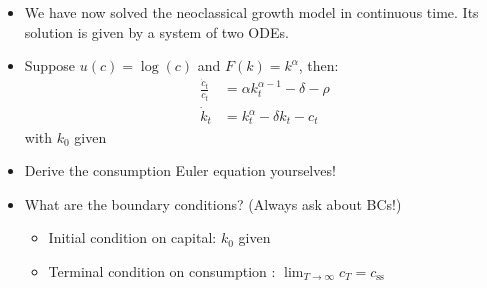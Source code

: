 \documentclass[10pt]{beamer}
\begin{document}
\begin{frame}{}

\begin{itemize}
\item We have now solved the neoclassical growth model in continuous time. Its solution is given by a system of two ODEs. 

\item Suppose $u(c) = \log(c)$ and $F(k) = k^\alpha$, then:
\begin{align*}
	\frac{\dot c_t}{c_t} &= \alpha k_t^{\alpha - 1} - \delta - \rho \\
	\dot k_t &= k_t^\alpha - \delta k_t - c_t
\end{align*}
with $k_0$ given

\item Derive the consumption Euler equation yourselves!

\item What are the boundary conditions? (Always ask about BCs!) 
\begin{itemize}
	\vspace{1mm}
	\item Initial condition on capital: $k_0$ given
	\vspace{-3mm}
	\item Terminal condition on consumption : $\lim_{T \to \infty} c_T = c_\text{ss}$ 
\end{itemize}

\end{itemize}
	
\end{frame}
\end{document}
